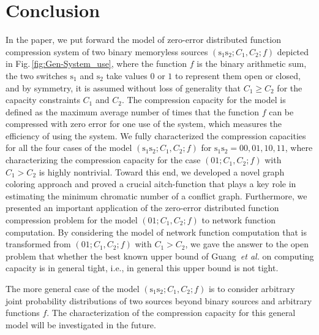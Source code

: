 \documentclass[11pt,draftclsnofoot,onecolumn]{IEEEtran}
\begin{document}
\section{Conclusion}\label{sec:concl}


In the paper, we put forward the model of zero-error distributed function compression system of two binary memoryless sources $(\boldsymbol{\mathrm{s}}_1\boldsymbol{\mathrm{s}}_2;C_{1}, C_{2}; f)$ depicted in Fig.\,\ref{fig:Gen-System_use}, where the function $f$ is the binary arithmetic sum, the two switches $\boldsymbol{\mathrm{s}}_1$ and $\boldsymbol{\mathrm{s}}_2$ take values $0$ or $1$ to represent them open or closed, and by symmetry, it is assumed without loss of generality that $C_1\geq C_2$ for the capacity constraints $C_1$ and $C_2$. The compression capacity for the model is defined as the maximum average number of times that the function $f$ can be compressed with zero error for one use of the system, which measures the efficiency of using the system. We  fully characterized the compression capacities for all the four cases of the model $(\boldsymbol{\mathrm{s}}_1\boldsymbol{\mathrm{s}}_2;C_{1}, C_{2}; f)$ for $\boldsymbol{\mathrm{s}}_1\boldsymbol{\mathrm{s}}_2=00,01,10,11$, where characterizing the compression capacity for the case $(01;C_1,C_2;f)$ with $C_1>C_2$ is highly nontrivial. Toward this end, we developed a novel graph coloring approach and proved a crucial aitch-function that plays a key role in estimating the minimum chromatic number of a conflict graph. Furthermore,
we presented an important application of the zero-error distributed function compression problem for the model $(01;C_1,C_2;f)$ to  network function computation. By considering the model of network function computation  that is transformed from $(01;C_1,C_2;f)$ with $C_1>C_2$,
 we gave the answer to the open problem that whether the best known upper bound of Guang~\emph{et al.} on computing capacity is in general tight, i.e., in general
this upper bound is  not tight.

The more general case of the model $(\boldsymbol{\mathrm{s}}_1\boldsymbol{\mathrm{s}}_2;C_{1}, C_{2}; f)$ is to consider arbitrary joint probability distributions of two sources beyond binary sources and arbitrary functions $f$. The characterization of the compression capacity for this general model will be investigated in the future.


\end{document}
